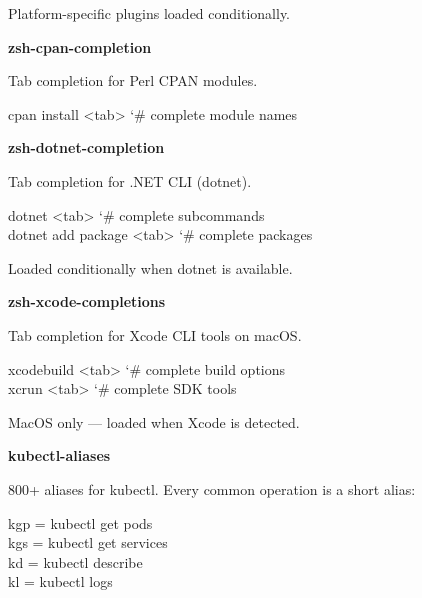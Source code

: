 \documentclass[11pt,a4paper,twoside]{book}
\begin{document}
Platform-specific plugins loaded conditionally.


\vspace{12pt}
{\bfseries\color{neonyellow} zsh-cpan-completion}\vspace{4pt}

Tab completion for Perl CPAN modules.

\begin{codebox}
\color{neongreen}cpan install <tab>       {\char`\#} complete module names\\
\end{codebox}


\vspace{12pt}
{\bfseries\color{neonyellow} zsh-dotnet-completion}\vspace{4pt}

Tab completion for .NET CLI (dotnet).

\begin{codebox}
\color{neongreen}dotnet <tab>             {\char`\#} complete subcommands\\
\color{neongreen}dotnet add package <tab>  {\char`\#} complete packages\\
\end{codebox}

Loaded conditionally when dotnet is available.


\vspace{12pt}
{\bfseries\color{neonyellow} zsh-xcode-completions}\vspace{4pt}

Tab completion for Xcode CLI tools on macOS.

\begin{codebox}
\color{neongreen}xcodebuild <tab>         {\char`\#} complete build options\\
\color{neongreen}xcrun <tab>              {\char`\#} complete SDK tools\\
\end{codebox}

MacOS only — loaded when Xcode is detected.


\vspace{12pt}
{\bfseries\color{neonyellow} kubectl-aliases}\vspace{4pt}

800+ aliases for kubectl. Every common operation is a short alias:

\begin{codebox}
\color{neongreen}kgp   = kubectl get pods\\
\color{neongreen}kgs   = kubectl get services\\
\color{neongreen}kd    = kubectl describe\\
\color{neongreen}kl    = kubectl logs\\
\end{codebox}
\end{document}
